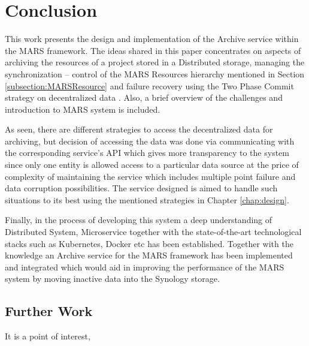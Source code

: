 \chapter{Conclusion}
This work presents the design and implementation of the Archive service within the MARS framework. The ideas shared
in this paper concentrates on aspects of archiving the resources of a project stored in a Distributed storage, managing the synchronization
-- control of the MARS Resources hierarchy mentioned in Section \ref{subsection:MARSResource} and failure recovery using the Two Phase Commit strategy
on decentralized data \cite{atomic}.
Also, a brief overview of the challenges and introduction to MARS system is included.

As seen, there are different strategies to access the decentralized data for archiving, but decision of accessing the data was done via communicating
with the corresponding service's API which gives more transparency to the system since only one entity is allowed access to a particular data source at the price of 
complexity of maintaining the service which includes multiple point failure and data corruption possibilities. The service designed is aimed to handle such situations
to its best using the mentioned strategies in Chapter \ref{chap:design}.

Finally, in the process of developing this system a deep understanding of Distributed System, Microservice together with the state-of-the-art technological stacks
such as Kubernetes, Docker etc has been established. Together with the knowledge an Archive service for the MARS framework has been implemented and integrated which
would aid in improving the performance of the MARS system by moving inactive data into the Synology storage.

\section{Further Work}
It is a point of interest, 


